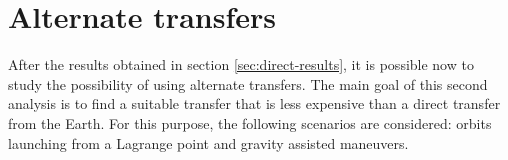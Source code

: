 \chapter{Alternate transfers}

After the results obtained in section \ref{sec:direct-results}, it is possible
now to study the possibility of using alternate transfers. The main goal of this
second analysis is to find a suitable transfer that is less expensive than a
direct transfer from the Earth. For this purpose, the following scenarios are
considered: orbits launching from a Lagrange point and gravity assisted
maneuvers.



